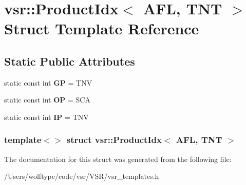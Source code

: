 \hypertarget{structvsr_1_1_product_idx_3_01_a_f_l_00_01_t_n_t_01_4}{\section{vsr\-:\-:Product\-Idx$<$ A\-F\-L, T\-N\-T $>$ Struct Template Reference}
\label{structvsr_1_1_product_idx_3_01_a_f_l_00_01_t_n_t_01_4}
}
\subsection*{Static Public Attributes}
\begin{DoxyCompactItemize}
\item 
\hypertarget{structvsr_1_1_product_idx_3_01_a_f_l_00_01_t_n_t_01_4_ae485e6e1ec548b0bfb478f590601c17f}{static const int {\bfseries G\-P} = T\-N\-V}\label{structvsr_1_1_product_idx_3_01_a_f_l_00_01_t_n_t_01_4_ae485e6e1ec548b0bfb478f590601c17f}

\item 
\hypertarget{structvsr_1_1_product_idx_3_01_a_f_l_00_01_t_n_t_01_4_a9a121dbd1a42eea6d372b8c6ff63ec3b}{static const int {\bfseries O\-P} = S\-C\-A}\label{structvsr_1_1_product_idx_3_01_a_f_l_00_01_t_n_t_01_4_a9a121dbd1a42eea6d372b8c6ff63ec3b}

\item 
\hypertarget{structvsr_1_1_product_idx_3_01_a_f_l_00_01_t_n_t_01_4_a3f85310b43f8f424075414cb53180af5}{static const int {\bfseries I\-P} = T\-N\-V}\label{structvsr_1_1_product_idx_3_01_a_f_l_00_01_t_n_t_01_4_a3f85310b43f8f424075414cb53180af5}

\end{DoxyCompactItemize}
\subsubsection*{template$<$$>$ struct vsr\-::\-Product\-Idx$<$ A\-F\-L, T\-N\-T $>$}



The documentation for this struct was generated from the following file\-:\begin{DoxyCompactItemize}
\item 
/\-Users/wolftype/code/vsr/\-V\-S\-R/vsr\-\_\-templates.\-h\end{DoxyCompactItemize}
